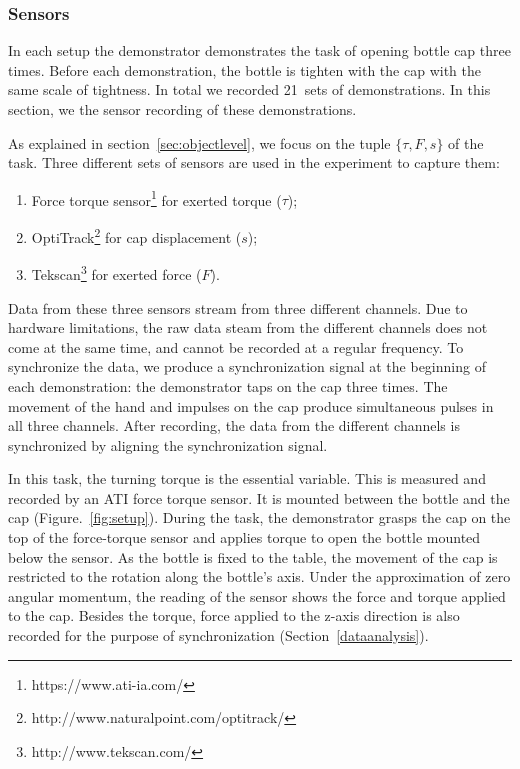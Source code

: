 \subsubsection{Sensors}
\label{sec:sensor}
In each setup the demonstrator demonstrates the task of opening bottle
cap three times. Before each demonstration, the bottle is tighten with
the cap with the same scale of tightness. In total we recorded 21~sets
of demonstrations. In this section, we the sensor recording of these
demonstrations.


As explained in section~\ref{sec:objectlevel}, we focus on the tuple
$\{\tau,F,s\}$ of the task. Three different sets of sensors are used in
the experiment to capture them:

\begin{enumerate}
\item Force torque sensor\footnote{https://www.ati-ia.com/} for exerted torque ($\tau$);
\item OptiTrack\footnote{http://www.naturalpoint.com/optitrack/} for cap displacement ($s$);
\item Tekscan\footnote{http://www.tekscan.com/} for exerted force ($F$).
\end{enumerate}

Data from these three sensors stream from three different
channels. Due to hardware limitations, the raw data steam from the
different channels does not come at the same time, and cannot be
recorded at a regular frequency. To synchronize the data, we produce a
synchronization signal at the beginning of each demonstration: the
demonstrator taps on the cap three times. The movement of the hand and
impulses on the cap produce simultaneous pulses in all three
channels. After recording, the data from the different channels is
synchronized by aligning the synchronization signal.


In this task, the turning torque is the essential variable. This is
measured and recorded by an ATI force torque sensor. It is mounted
between the bottle and the cap (Figure.~\ref{fig:setup}). During the
task, the demonstrator grasps the cap on the top of the force-torque
sensor and applies torque to open the bottle mounted below the
sensor. As the bottle is fixed to the table, the movement of the cap
is restricted to the rotation along the bottle's axis. Under the
approximation of zero angular momentum, the reading of the sensor
shows the force and torque applied to the cap. Besides the torque,
force applied to the z-axis direction is also recorded for the purpose
of synchronization (Section~\ref{dataanalysis}).

